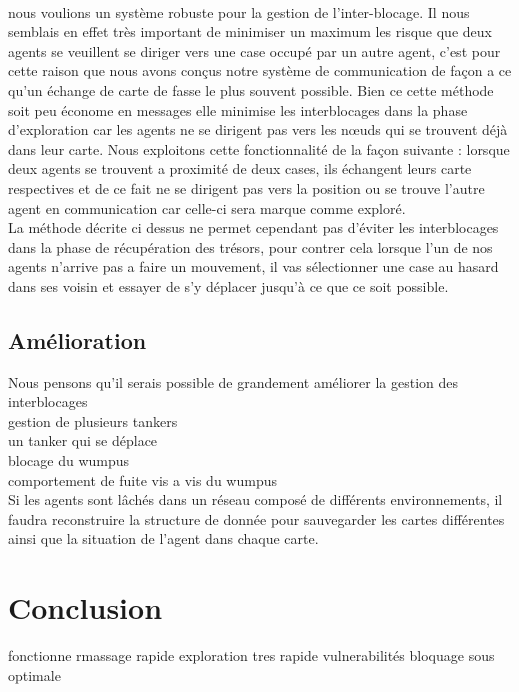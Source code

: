 \documentclass[10pt]{article}
\newcommand\tab[1][0.65cm]{\hspace*{#1}}
\begin{document}
\paragraph{}nous voulions un système robuste pour la gestion de l'inter-blocage. Il nous semblais en effet très important de minimiser un maximum les risque que deux agents se veuillent se  diriger vers une case occupé par un autre agent, c'est pour cette raison que nous avons conçus notre système de communication de façon a ce qu'un échange de carte de fasse le plus souvent possible. Bien ce cette méthode soit peu économe en messages elle minimise les interblocages dans la phase d'exploration car les agents ne se dirigent pas vers les nœuds qui se trouvent déjà dans leur carte. Nous exploitons cette fonctionnalité de la façon suivante : lorsque deux agents se trouvent a proximité de deux cases, ils échangent leurs carte respectives et de ce fait ne se dirigent pas vers la position ou se trouve l'autre agent en communication car celle-ci sera marque comme exploré.\\
\tab La méthode décrite ci dessus ne permet cependant pas d'éviter les interblocages dans la phase de récupération des trésors, pour contrer cela lorsque l'un de nos agents n'arrive pas a faire un mouvement, il vas sélectionner une case au hasard dans ses voisin et essayer de s'y déplacer jusqu'à ce que ce soit possible.

\subsection{Amélioration}
Nous pensons qu'il serais possible de grandement améliorer la gestion des interblocages \\
\tab gestion de plusieurs tankers \\
\tab un tanker qui se déplace \\
\tab blocage du wumpus\\
\tab comportement de fuite vis a vis du wumpus \\
\tab Si les agents sont lâchés dans un réseau composé de différents environnements, il faudra reconstruire la structure de donnée pour sauvegarder les cartes différentes ainsi que la situation de l'agent dans chaque carte.
\section{Conclusion}
fonctionne 
rmassage rapide 
exploration tres rapide 
vulnerabilités 
bloquage
sous optimale 



	
\end{document}
